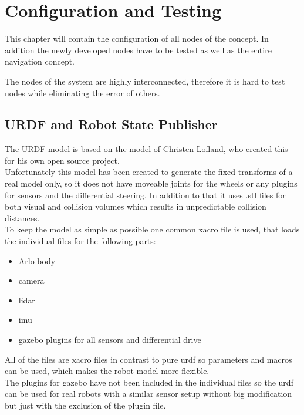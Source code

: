 \chapter{Configuration and Testing}
\label{configurationandtesting}

This chapter will contain the configuration of all nodes of the concept. In addition the newly developed nodes have to be tested as well as the entire navigation concept.

The nodes of the system are highly interconnected, therefore it is hard to test nodes while eliminating the error of others.

\section{URDF and Robot State Publisher}

The URDF model is based on the model of Christen Lofland, who created this for his own open source project\cite{chrisl8}.\\

Unfortunately this model has been created to generate the fixed transforms of a real model only, so it does not have moveable joints for the wheels or any plugins for sensors and the differential steering. In addition to that it uses .stl files for both visual and collision volumes which results in unpredictable collision distances.\\

To keep the model as simple as possible one common xacro file is used, that loads the individual files for the following parts:
\begin{itemize}
	\item Arlo body
	\item camera
	\item lidar
	\item imu
	\item gazebo plugins for all sensors and differential drive
\end{itemize}

All of the files are xacro files in contrast to pure urdf so parameters and macros can be used, which makes the robot model more flexible.\\

The plugins for gazebo have not been included in the individual files so the urdf can be used for real robots with a similar sensor setup without big modification but just with the exclusion of the plugin file.

